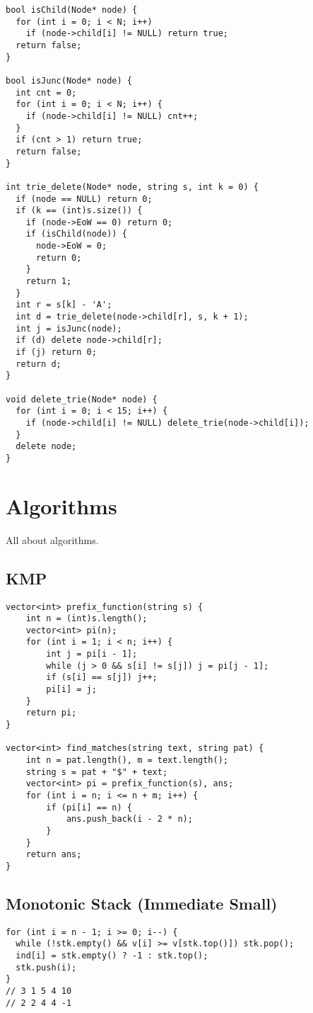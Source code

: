 \documentclass[10pt, a4paper]{article}
\begin{document}
\begin{multicols}{2}
\begin{lstlisting}
bool isChild(Node* node) {
  for (int i = 0; i < N; i++)
    if (node->child[i] != NULL) return true;
  return false;
}

bool isJunc(Node* node) {
  int cnt = 0;
  for (int i = 0; i < N; i++) {
    if (node->child[i] != NULL) cnt++;
  }
  if (cnt > 1) return true;
  return false;
}

int trie_delete(Node* node, string s, int k = 0) {
  if (node == NULL) return 0;
  if (k == (int)s.size()) {
    if (node->EoW == 0) return 0;
    if (isChild(node)) {
      node->EoW = 0;
      return 0;
    }
    return 1;
  }
  int r = s[k] - 'A';
  int d = trie_delete(node->child[r], s, k + 1);
  int j = isJunc(node);
  if (d) delete node->child[r];
  if (j) return 0;
  return d;
}

void delete_trie(Node* node) {
  for (int i = 0; i < 15; i++) {
    if (node->child[i] != NULL) delete_trie(node->child[i]);
  }
  delete node;
}
\end{lstlisting}
\section{Algorithms}
All about algorithms.
\subsection{KMP}
\begin{lstlisting}
vector<int> prefix_function(string s) {
    int n = (int)s.length();
    vector<int> pi(n);
    for (int i = 1; i < n; i++) {
        int j = pi[i - 1];
        while (j > 0 && s[i] != s[j]) j = pi[j - 1];
        if (s[i] == s[j]) j++;
        pi[i] = j;
    }
    return pi;
}

vector<int> find_matches(string text, string pat) {
    int n = pat.length(), m = text.length();
    string s = pat + "$" + text;
    vector<int> pi = prefix_function(s), ans;
    for (int i = n; i <= n + m; i++) {
        if (pi[i] == n) {
            ans.push_back(i - 2 * n);
        }
    }
    return ans;
}
\end{lstlisting}
\subsection{Monotonic Stack (Immediate \allowbreak Small)}
\begin{lstlisting}
for (int i = n - 1; i >= 0; i--) {
  while (!stk.empty() && v[i] >= v[stk.top()]) stk.pop();
  ind[i] = stk.empty() ? -1 : stk.top();
  stk.push(i);
}
// 3 1 5 4 10
// 2 2 4 4 -1
\end{lstlisting}


\end{multicols}
\end{document}
